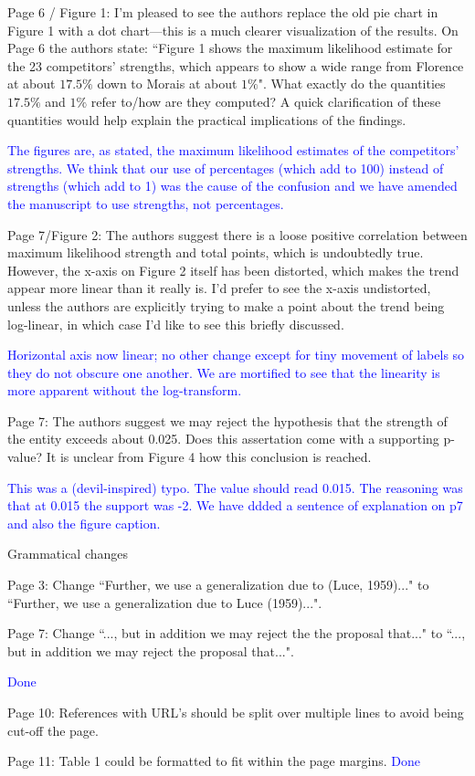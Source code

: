 \documentclass[12pt]{article}
\begin{document}
Page 6 / Figure 1: I'm pleased to see the authors replace the old pie
chart in Figure 1 with a dot chart---this is a much clearer
visualization of the results.  On Page 6 the authors state: ``Figure 1
shows the maximum likelihood estimate for the 23 competitors'
strengths, which appears to show a wide range from Florence at about
$17.5\%$ down to Morais at about $1\%$". What exactly do the
quantities $17.5\%$ and $1\%$ refer to/how are they computed? A quick
clarification of these quantities would help explain the practical
implications of the findings.

\textcolor{blue}{The figures are, as stated, the maximum likelihood
  estimates of the competitors' strengths.  We think that our use of
  percentages (which add to 100) instead of strengths (which add to 1)
  was the cause of the confusion and we have amended the manuscript to
  use strengths, not percentages.}

Page 7/Figure 2: The authors suggest there is a loose positive
correlation between maximum likelihood strength and total points,
which is undoubtedly true. However, the x-axis on Figure 2 itself has
been distorted, which makes the trend appear more linear than it
really is. I'd prefer to see the x-axis undistorted, unless the
authors are explicitly trying to make a point about the trend being
log-linear, in which case I'd like to see this briefly discussed.

\textcolor{blue}{Horizontal axis now linear; no other change except
  for tiny movement of labels so they do not obscure one another.  We
  are mortified to see that the linearity is more apparent without the
  log-transform.}

Page 7: The authors suggest we may reject the hypothesis that the
strength of the entity exceeds about 0.025. Does this assertation come
with a supporting p-value? It is unclear from Figure 4 how this
conclusion is reached.

\textcolor{blue}{This was a (devil-inspired) typo.  The value should
  read 0.015.  The reasoning was that at 0.015 the support was -2.  We
  have ddded a sentence of explanation on p7 and also the figure
  caption.}


Grammatical changes

Page 3: Change ``Further, we use a generalization due to (Luce,
1959)..." to ``Further, we use a generalization due to Luce
(1959)...".

Page 7: Change ``..., but in addition we may reject the
the proposal that..." to ``..., but in addition we may reject the
proposal that...".

\textcolor{blue}{Done}

Page 10: References with URL's should be split over multiple lines to avoid being cut-off the page.

Page 11: Table 1 could be formatted to fit within the page margins.
\textcolor{blue}{Done}
\end{document}
